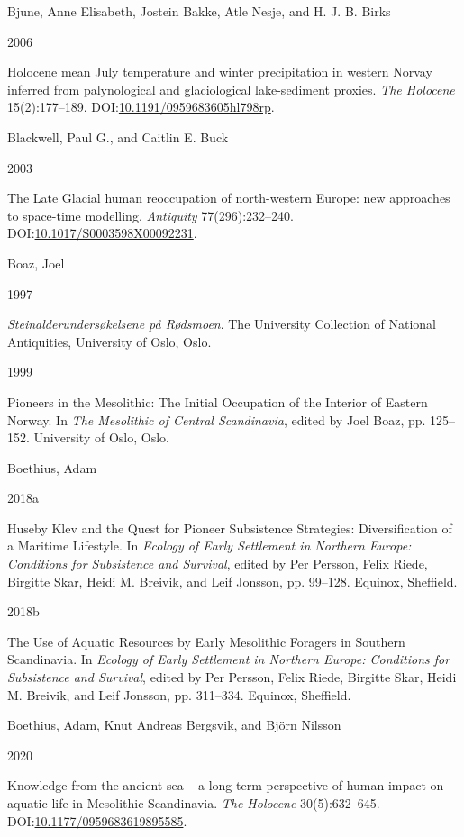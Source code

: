 \documentclass[
  12pt,
  a4paper,
  oneside]{book}
\newlength{\cslhangindent}
\newlength{\csllabelwidth}
\newlength{\cslentryspacingunit} %
\newenvironment{CSLReferences}[2] %
 {%
  \setlength{\parindent}{0pt}
  \ifodd #1
  \let\oldpar\par
  \def\par{\hangindent=\cslhangindent\oldpar}
  \fi
  \setlength{\parskip}{#2\cslentryspacingunit}
 }%
 {}
\newcommand{\CSLBlock}[1]{#1\hfill\break}
\newcommand{\CSLLeftMargin}[1]{\parbox[t]{\csllabelwidth}{#1}}
\newcommand{\CSLRightInline}[1]{\parbox[t]{\linewidth - \csllabelwidth}{#1}\break}
\begin{document}
\begin{CSLReferences}{0}{0}
\leavevmode{}%
\CSLBlock{Bjune, Anne Elisabeth, Jostein Bakke, Atle Nesje, and H. J. B. Birks}
\CSLLeftMargin{ 2006}%
\CSLRightInline{{Holocene mean July temperature and winter precipitation in western Norvay inferred from palynological and glaciological lake-sediment proxies}. \emph{The Holocene} 15(2):177--189. DOI:\href{https://doi.org/10.1191/0959683605hl798rp}{10.1191/0959683605hl798rp}.}

\leavevmode{}%
\CSLBlock{Blackwell, Paul G., and Caitlin E. Buck}
\CSLLeftMargin{ 2003}%
\CSLRightInline{The Late Glacial human reoccupation of north-western Europe: new approaches to space-time modelling. \emph{Antiquity} 77(296):232--240. DOI:\href{https://doi.org/10.1017/S0003598X00092231}{10.1017/S0003598X00092231}.}

\leavevmode{}%
\CSLBlock{Boaz, Joel}
\CSLLeftMargin{ 1997}%
\CSLRightInline{\emph{{Steinalderundersøkelsene på Rødsmoen}}. The University Collection of National Antiquities, University of Oslo, Oslo.}

\leavevmode{}%
\CSLLeftMargin{ 1999 }%
\CSLRightInline{{Pioneers in the Mesolithic: The Initial Occupation of the Interior of Eastern Norway}. In \emph{{The Mesolithic of Central Scandinavia}}, edited by Joel Boaz, pp. 125--152. University of Oslo, Oslo.}

\leavevmode{}%
\CSLBlock{Boethius, Adam}
\CSLLeftMargin{ 2018a}%
\CSLRightInline{{Huseby Klev and the Quest for Pioneer Subsistence Strategies: Diversification of a Maritime Lifestyle}. In \emph{{Ecology of Early Settlement in Northern Europe: Conditions for Subsistence and Survival}}, edited by Per Persson, Felix Riede, Birgitte Skar, Heidi M. Breivik, and Leif Jonsson, pp. 99--128. Equinox, Sheffield.}

\leavevmode{}%
\CSLLeftMargin{ 2018b }%
\CSLRightInline{{The Use of Aquatic Resources by Early Mesolithic Foragers in Southern Scandinavia}. In \emph{{Ecology of Early Settlement in Northern Europe: Conditions for Subsistence and Survival}}, edited by Per Persson, Felix Riede, Birgitte Skar, Heidi M. Breivik, and Leif Jonsson, pp. 311--334. Equinox, Sheffield.}

\leavevmode{}%
\CSLBlock{Boethius, Adam, Knut Andreas Bergsvik, and Björn Nilsson}
\CSLLeftMargin{ 2020}%
\CSLRightInline{{Knowledge from the ancient sea -- a long-term perspective of human impact on aquatic life in Mesolithic Scandinavia}. \emph{The Holocene} 30(5):632--645. DOI:\href{https://doi.org/10.1177/0959683619895585}{10.1177/0959683619895585}.}


\end{CSLReferences}
\end{document}
